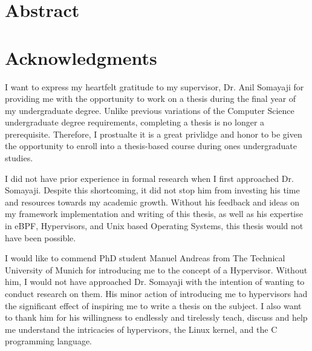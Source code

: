 \documentclass{report}
\begin{document}
\begin{spacing}{1.5}











\newpage
{}
\chapter*{Abstract}
















\newpage

\chapter*{Acknowledgments}

{\large I want to express my heartfelt gratitude to my supervisor, Dr. Anil Somayaji for providing me with the opportunity to work on a thesis during the final year of my undergraduate degree. Unlike previous variations of the Computer Science undergraduate degree requirements, completing a thesis is no longer a prerequisite. Therefore, I prostualte it is a great privlidge and honor to be given the opportunity to enroll into a thesis-based course during ones undergraduate studies.}

{\large I did not have prior experience in formal research when I first approached Dr. Somayaji. Despite this shortcoming, it did not stop him from investing his time and resources towards my academic growth. Without his feedback and ideas on my framework implementation and writing of this thesis, as well as his expertise in eBPF, Hypervisors, and Unix based Operating Systems, this thesis would not have been possible.}

{\large I would like to commend PhD student Manuel Andreas from The Technical University of Munich for introducing me to the concept of a Hypervisor. Without him, I would not have approached Dr. Somayaji with the intention of wanting to conduct research on them. His minor action of introducing me to hypervisors had the significant effect of inspiring me to write a thesis on the subject. I also want to thank him for his willingness to endlessly and tirelessly teach, discuss and help me understand the intricacies of hypervisors, the Linux kernel, and the C programming language.} 


\end{spacing}
\end{document}
